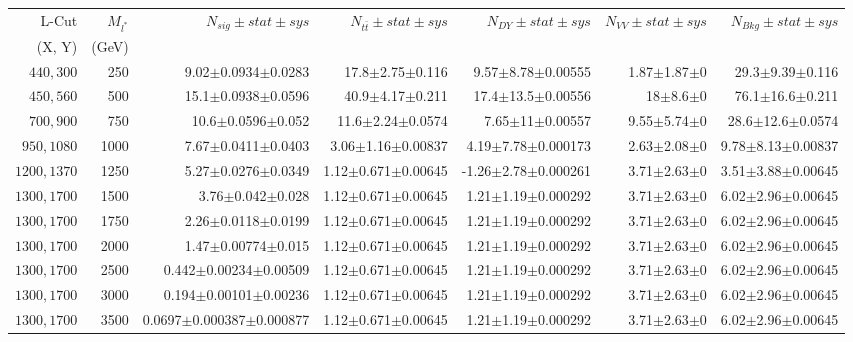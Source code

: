 \documentclass[]{article}
\begin{document}
\begin{table}
\begin{center}
\scriptsize{
\begin{tabular}{ |r|r|r|r|r|r|r|}
\hline 
L-Cut & $M_{l^*}$ & $N_{sig}\pm stat \pm sys $ &$N_{t\bar{t}}\pm stat \pm sys $ & $N_{DY}\pm stat \pm sys $ & $N_{VV}\pm stat \pm sys $ &$N_{Bkg}\pm stat \pm sys$\\
(X, Y) & (GeV) & && &&\\
\hline 
$440, 300$ & 250 & 9.02$\pm$0.0934$\pm$0.0283 & 17.8$\pm$2.75$\pm$0.116 & 9.57$\pm$8.78$\pm$0.00555 & 1.87$\pm$1.87$\pm$0 & 29.3$\pm$9.39$\pm$0.116 \\
$450, 560$ & 500 & 15.1$\pm$0.0938$\pm$0.0596 & 40.9$\pm$4.17$\pm$0.211 & 17.4$\pm$13.5$\pm$0.00556 & 18$\pm$8.6$\pm$0 & 76.1$\pm$16.6$\pm$0.211 \\
$700, 900$ & 750 & 10.6$\pm$0.0596$\pm$0.052 & 11.6$\pm$2.24$\pm$0.0574 & 7.65$\pm$11$\pm$0.00557 & 9.55$\pm$5.74$\pm$0 & 28.6$\pm$12.6$\pm$0.0574 \\
$950, 1080$ & 1000 & 7.67$\pm$0.0411$\pm$0.0403 & 3.06$\pm$1.16$\pm$0.00837 & 4.19$\pm$7.78$\pm$0.000173 & 2.63$\pm$2.08$\pm$0 & 9.78$\pm$8.13$\pm$0.00837 \\
$1200, 1370$ & 1250 & 5.27$\pm$0.0276$\pm$0.0349 & 1.12$\pm$0.671$\pm$0.00645 & -1.26$\pm$2.78$\pm$0.000261 & 3.71$\pm$2.63$\pm$0 & 3.51$\pm$3.88$\pm$0.00645 \\
$1300, 1700$ & 1500 & 3.76$\pm$0.042$\pm$0.028 & 1.12$\pm$0.671$\pm$0.00645 & 1.21$\pm$1.19$\pm$0.000292 & 3.71$\pm$2.63$\pm$0 & 6.02$\pm$2.96$\pm$0.00645 \\
$1300, 1700$ & 1750 & 2.26$\pm$0.0118$\pm$0.0199 & 1.12$\pm$0.671$\pm$0.00645 & 1.21$\pm$1.19$\pm$0.000292 & 3.71$\pm$2.63$\pm$0 & 6.02$\pm$2.96$\pm$0.00645 \\
$1300, 1700$ & 2000 & 1.47$\pm$0.00774$\pm$0.015 & 1.12$\pm$0.671$\pm$0.00645 & 1.21$\pm$1.19$\pm$0.000292 & 3.71$\pm$2.63$\pm$0 & 6.02$\pm$2.96$\pm$0.00645 \\
$1300, 1700$ & 2500 & 0.442$\pm$0.00234$\pm$0.00509 & 1.12$\pm$0.671$\pm$0.00645 & 1.21$\pm$1.19$\pm$0.000292 & 3.71$\pm$2.63$\pm$0 & 6.02$\pm$2.96$\pm$0.00645 \\
$1300, 1700$ & 3000 & 0.194$\pm$0.00101$\pm$0.00236 & 1.12$\pm$0.671$\pm$0.00645 & 1.21$\pm$1.19$\pm$0.000292 & 3.71$\pm$2.63$\pm$0 & 6.02$\pm$2.96$\pm$0.00645 \\
$1300, 1700$ & 3500 & 0.0697$\pm$0.000387$\pm$0.000877 & 1.12$\pm$0.671$\pm$0.00645 & 1.21$\pm$1.19$\pm$0.000292 & 3.71$\pm$2.63$\pm$0 & 6.02$\pm$2.96$\pm$0.00645 \\

\end{tabular}}
\end{center}
\end{table}
\end{document}
